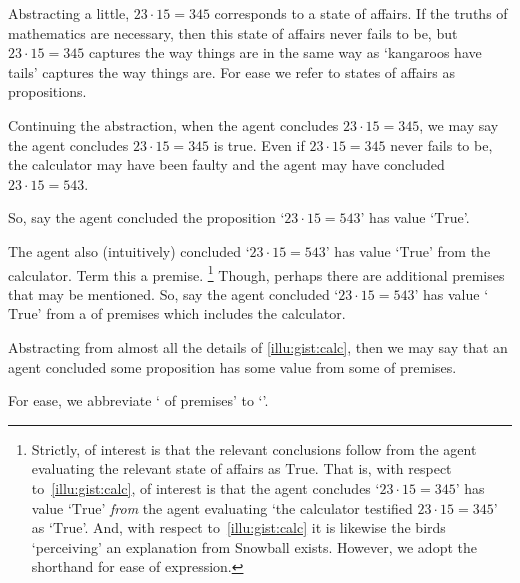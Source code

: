\begin{note}
  Abstracting a little, \(23 \cdot 15 = 345\) corresponds to a state of affairs.
  If the truths of mathematics are necessary, then this state of affairs never fails to be, but \(23 \cdot 15 = 345\) captures the way things are in the same way as `kangaroos have tails' captures the way things are.
  For ease we refer to states of affairs as propositions.

  Continuing the abstraction, when the agent concludes \(23 \cdot 15 = 345\), we may say the agent concludes \(23 \cdot 15 = 345\) is true.
  Even if \(23 \cdot 15 = 345\) never fails to be, the calculator may have been faulty and the agent may have concluded \(23 \cdot 15 = 543\).

  So, say the agent concluded the proposition `\(23 \cdot 15 = 543\)' has value `\(\text{True}\)'.

  The agent also (intuitively) concluded `\(23 \cdot 15 = 543\)' has value `\(\text{True}\)' from the calculator.
  Term this a premise.%
  \footnote{
    Strictly, of interest is that the relevant conclusions follow from the agent evaluating the relevant state of affairs as \(\text{True}\).
    That is, with respect to~\autoref{illu:gist:calc}, of interest is that the agent concludes `\(23 \cdot 15 = 345\)' has value `\(\text{True}\)' \emph{from} the agent evaluating `the calculator testified \(23 \cdot 15 = 345\)' as `\(\text{True}\)'.
    And, with respect to~\autoref{illu:gist:calc} it is likewise the birds `perceiving' an explanation from Snowball exists.
    However, we adopt the shorthand for ease of expression.
  }
  Though, perhaps there are additional premises that may be mentioned.
  So, say the agent concluded `\(23 \cdot 15 = 543\)' has value `\(\text{True}\)' from a \pool{} of premises which includes the calculator.
\end{note}

\begin{note}
  Abstracting from almost all the details of \autoref{illu:gist:calc}, then we may say that an agent concluded some proposition has some value from some \pool{} of premises.

  For ease, we abbreviate `\pool{} of premises' to `\pool{}'.
\end{note}

